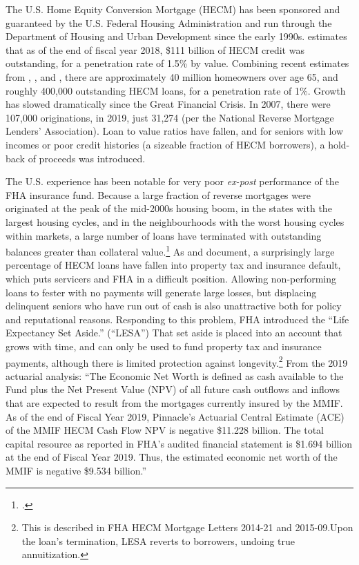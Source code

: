 \documentclass[12pt]{article}
\begin{document}
The U.S. Home Equity Conversion Mortgage (HECM) has been sponsored and
guaranteed by the U.S.  Federal Housing Administration and run through the
Department of Housing and Urban Development since the early 1990s.
\textcite{CBO_HECM} estimates that as of the end of fiscal year 2018, \$111
billion of HECM credit was outstanding, for a penetration rate of 1.5\% by
value.  Combining recent estimates from \textcite{CBO_HECM},
\textcite{JointCenter}, and \textcite{ACL}, there are approximately 40 million
homeowners over age 65, and roughly 400,000 outstanding HECM loans, for a
penetration rate of 1\%. Growth has slowed dramatically since the Great
Financial Crisis. In 2007, there were 107,000 originations, in 2019, just
31,274 (per the National Reverse Mortgage Lenders' Association). Loan to value
ratios have fallen, and for seniors with low incomes or poor credit histories
(a sizeable fraction of HECM borrowers), a hold-back of proceeds was introduced.

The U.S. experience has been notable for very poor \emph{ex-post} performance
of the FHA insurance fund. Because a large fraction of reverse mortgages were
originated at the peak of the mid-2000s housing boom, in the states with the
largest housing cycles, and in the neighbourhoods with the worst housing cycles
within markets, a large number of loans have terminated with outstanding
balances greater than collateral
value.\footnote{\textcite{Davidoffhecmdemographics}.} As
\textcite{Haurindefault} and \textcite{Begleyetal} document, a surprisingly large
percentage of HECM loans have fallen into property tax and insurance default,
which puts servicers and FHA in a difficult position. Allowing non-performing
loans to fester with no payments will generate large losses, but displacing
delinquent seniors who have run out of cash is also unattractive both for
policy and reputational reasons. Responding to this problem, FHA introduced the
``Life Expectancy Set Aside.'' (``LESA'') That set aside is placed into an
account that grows with time, and can only be used to fund property tax and
insurance payments, although there is limited protection against
longevity.\footnote{This is described in FHA HECM Mortgage Letters 2014-21 and
2015-09.Upon the loan's termination, LESA reverts to borrowers, undoing true
annuitization.} From the 2019 actuarial analysis: ``The Economic Net Worth is
defined as cash available to the Fund plus the Net Present Value (NPV) of all
future cash outflows and inflows that are expected to result from the mortgages
currently insured by the MMIF.  As of the end of Fiscal Year 2019, Pinnacle’s
Actuarial Central Estimate (ACE) of the MMIF HECM Cash Flow NPV is negative
\$11.228 billion.  The total capital resource as reported in FHA’s audited
financial statement is \$1.694 billion at the end of Fiscal Year 2019. Thus,
the estimated economic net worth of the MMIF is negative \$9.534 billion.''
\end{document}
